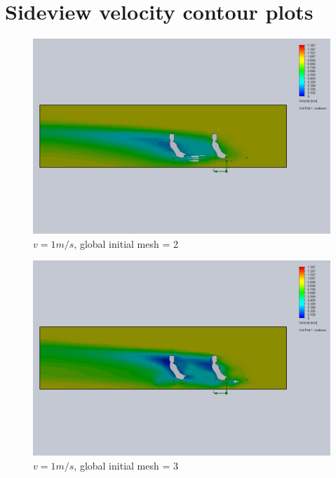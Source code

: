 \documentclass[11pt]{article}
\begin{document}
\section*{Sideview velocity contour plots}

\begin{figure}
\includegraphics[width=\textwidth]{gm_2_rf_7_v01.png}
\caption{$v = 1 m/s$, global initial mesh = 2}
\end{figure}

\begin{figure}
\includegraphics[width=\textwidth]{gm_3_rf_7_v01.png}
\caption{$v = 1 m/s$, global initial mesh = 3}
\end{figure}
\end{document}
